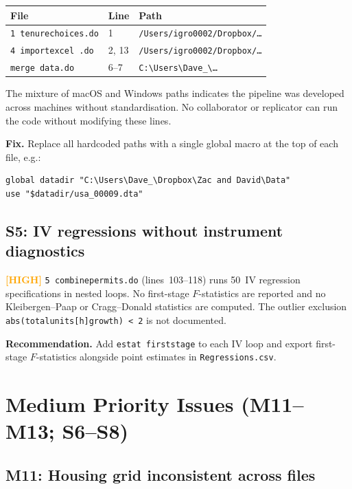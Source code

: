 \documentclass[11pt]{article}
\newcommand{\high}{\textcolor{orange}{\textbf{[HIGH]}}}
\begin{document}
\begin{center}
\begin{tabular}{lll}
\toprule
File & Line & Path \\
\midrule
\texttt{1 tenurechoices.do} & 1 & \texttt{/Users/igro0002/Dropbox/\ldots} \\
\texttt{4 importexcel .do} & 2, 13 & \texttt{/Users/igro0002/Dropbox/\ldots} \\
\texttt{merge data.do} & 6--7 & \texttt{C:\textbackslash{}Users\textbackslash{}Dave\_\textbackslash{}\ldots} \\
\bottomrule
\end{tabular}
\end{center}

The mixture of macOS and Windows paths indicates the pipeline was developed
across machines without standardisation. No collaborator or replicator can run
the code without modifying these lines.

\noindent\textbf{Fix.} Replace all hardcoded paths with a single global macro
at the top of each file, e.g.:
\begin{verbatim}
global datadir "C:\Users\Dave_\Dropbox\Zac and David\Data"
use "$datadir/usa_00009.dta"
\end{verbatim}

\subsection*{S5: IV regressions without instrument diagnostics}

\high{} \texttt{5 combinepermits.do} (lines~103--118) runs 50~IV regression
specifications in nested loops. No first-stage $F$-statistics are reported and
no Kleibergen--Paap or Cragg--Donald statistics are computed. The outlier
exclusion \texttt{abs(totalunits[h]growth) < 2} is not documented.

\noindent\textbf{Recommendation.} Add \texttt{estat firststage} to each IV loop
and export first-stage $F$-statistics alongside point estimates in
\texttt{Regressions.csv}.

\section*{Medium Priority Issues (M11--M13; S6--S8)}

\subsection*{M11: Housing grid inconsistent across files}
\end{document}
